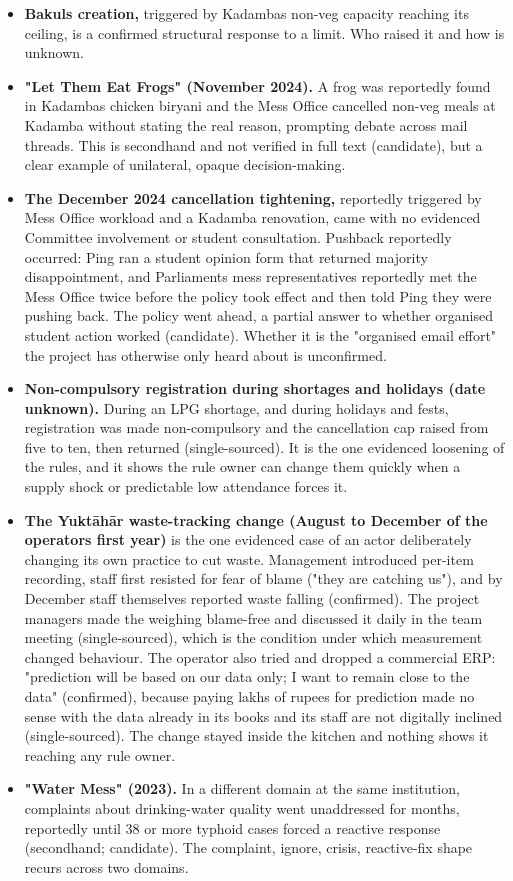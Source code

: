 \documentclass[
  10pt,
  table]{article}
\providecommand{\tightlist}{%
  \setlength{\itemsep}{0pt}\setlength{\parskip}{0pt}}
\renewcommand{\tightlist}{\setlength{\itemsep}{1.5pt}\setlength{\parskip}{0pt}}
\begin{document}
\begin{itemize}
\tightlist
\item
  \textbf{Bakul\textquotesingle s creation,} triggered by Kadamba\textquotesingle s non-veg capacity reaching its ceiling, is a confirmed structural response to a limit. Who raised it and how is unknown.
\item
  \textbf{"Let Them Eat Frogs" (November 2024).} A frog was reportedly found in Kadamba\textquotesingle s chicken biryani and the Mess Office cancelled non-veg meals at Kadamba without stating the real reason, prompting debate across mail threads. This is secondhand and not verified in full text (candidate), but a clear example of unilateral, opaque decision-making.
\item
  \textbf{The December 2024 cancellation tightening,} reportedly triggered by Mess Office workload and a Kadamba renovation, came with no evidenced Committee involvement or student consultation. Pushback reportedly occurred: Ping ran a student opinion form that returned majority disappointment, and Parliament\textquotesingle s mess representatives reportedly met the Mess Office twice before the policy took effect and then told Ping they were pushing back. The policy went ahead, a partial answer to whether organised student action worked (candidate). Whether it is the "organised email effort" the project has otherwise only heard about is unconfirmed.
\item
  \textbf{Non-compulsory registration during shortages and holidays (date unknown).} During an LPG shortage, and during holidays and fests, registration was made non-compulsory and the cancellation cap raised from five to ten, then returned (single-sourced). It is the one evidenced loosening of the rules, and it shows the rule owner can change them quickly when a supply shock or predictable low attendance forces it.
\item
  \textbf{The Yuktāhār waste-tracking change (August to December of the operator\textquotesingle s first year)} is the one evidenced case of an actor deliberately changing its own practice to cut waste. Management introduced per-item recording, staff first resisted for fear of blame ("they are catching us"), and by December staff themselves reported waste falling (confirmed). The project managers made the weighing blame-free and discussed it daily in the team meeting (single-sourced), which is the condition under which measurement changed behaviour. The operator also tried and dropped a commercial ERP: "prediction will be based on our data only; I want to remain close to the data" (confirmed), because paying lakhs of rupees for prediction made no sense with the data already in its books and its staff are not digitally inclined (single-sourced). The change stayed inside the kitchen and nothing shows it reaching any rule owner.
\item
  \textbf{"Water Mess" (2023).} In a different domain at the same institution, complaints about drinking-water quality went unaddressed for months, reportedly until 38 or more typhoid cases forced a reactive response (secondhand; candidate). The complaint, ignore, crisis, reactive-fix shape recurs across two domains.
\end{itemize}
\end{document}
